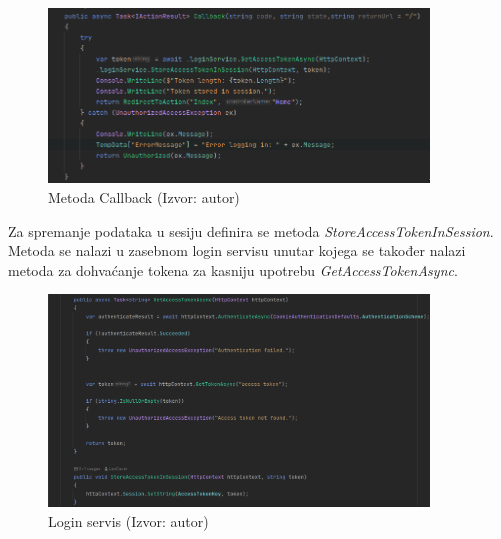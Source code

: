 \documentclass{foi}
\begin{document}
\begin{figure}[H]
    \centering
    \includegraphics[width=0.9\textwidth]{slike/callbackFunction.png}
    \caption{Metoda Callback (Izvor: autor)}
    \label{fig:Callback}

\end{figure}
Za spremanje podataka u sesiju definira se metoda \textit{StoreAccessTokenInSession}. Metoda se nalazi u zasebnom login servisu unutar kojega se također nalazi metoda za dohvaćanje tokena za kasniju upotrebu \textit{GetAccessTokenAsync}.
\begin{figure}[H]
    \centering
    \includegraphics[width=0.9\textwidth]{slike/storeToken.png}
    \caption{Login servis (Izvor: autor)}
    \label{fig:StoreAccessTokenInSession}

\end{figure}
\end{document}
